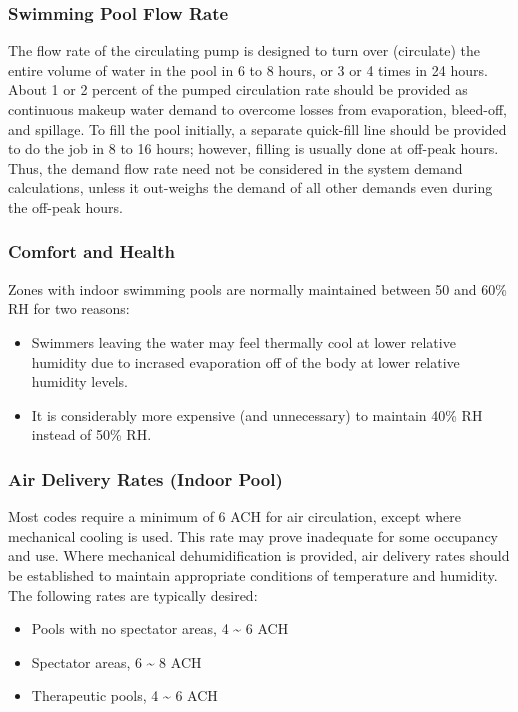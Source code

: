 \subsubsection{Swimming Pool Flow Rate}\label{swimming-pool-flow-rate}

The flow rate of the circulating pump is designed to turn over (circulate) the entire volume of water in the pool in 6 to 8 hours, or 3 or 4 times in 24 hours. About 1 or 2 percent of the pumped circulation rate should be provided as continuous makeup water demand to overcome losses from evaporation, bleed-off, and spillage. To fill the pool initially, a separate quick-fill line should be provided to do the job in 8 to 16 hours; however, filling is usually done at off-peak hours. Thus, the demand flow rate need not be considered in the system demand calculations, unless it out-weighs the demand of all other demands even during the off-peak hours.

\subsubsection{Comfort and Health}\label{comfort-and-health}

Zones with indoor swimming pools are normally maintained between 50 and 60\% RH for two reasons:

\begin{itemize}
\tightlist
\item
  Swimmers leaving the water may feel thermally cool at lower relative humidity due to incrased evaporation off of the body at lower relative humidity levels.
\item
  It is considerably more expensive (and unnecessary) to maintain 40\% RH instead of 50\% RH.
\end{itemize}

\subsubsection{Air Delivery Rates (Indoor Pool)}\label{air-delivery-rates-indoor-pool}

Most codes require a minimum of 6 ACH for air circulation, except where mechanical cooling is used. This rate may prove inadequate for some occupancy and use. Where mechanical dehumidification is provided, air delivery rates should be established to maintain appropriate conditions of temperature and humidity. The following rates are typically desired:

\begin{itemize}
\tightlist
\item
  Pools with no spectator areas, 4 \textasciitilde{} 6 ACH
\item
  Spectator areas, 6 \textasciitilde{} 8 ACH
\item
  Therapeutic pools, 4 \textasciitilde{} 6 ACH
\end{itemize}

